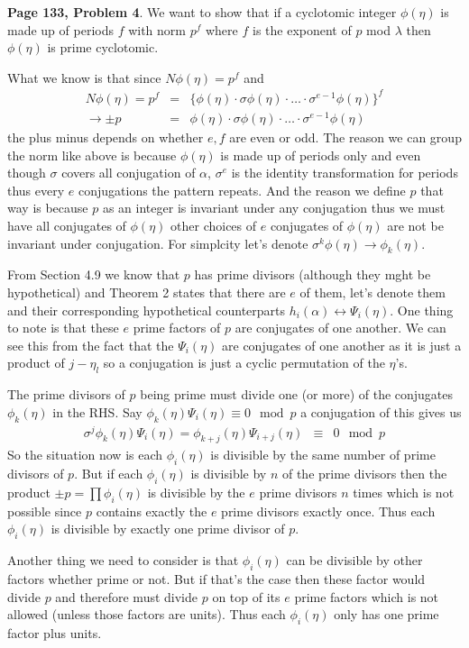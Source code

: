\documentclass[aps,preprint,preprintnumbers,nofootinbib,showpacs,prd]{revtex4-1}
\newcommand{\nbea}{\begin{eqnarray*}}
\newcommand{\neea}{\end{eqnarray*}}
\begin{document}
{\bf Page 133, Problem 4}. We want to show that if a cyclotomic integer $\phi(\eta)$ is made up of periods $f$ with norm $p^f$ where $f$ is the exponent of $p$ mod $\lambda$ then $\phi(\eta)$ is prime cyclotomic.

What we know is that since $N\phi(\eta) = p^f$ and
%
\nbea
N\phi(\eta) = p^f & = & \{\phi(\eta) \cdot \sigma\phi(\eta) \cdot \dots \cdot \sigma^{e-1}\phi(\eta) \}^f \\
\to \pm p & = & \phi(\eta) \cdot \sigma\phi(\eta) \cdot \dots \cdot \sigma^{e-1}\phi(\eta)
\neea
%
the plus minus depends on whether $e, f$ are even or odd. The reason we can group the norm like above is because $\phi(\eta)$ is made up of periods only and even though $\sigma$ covers all conjugation of $\alpha$, $\sigma^e$ is the identity transformation for periods thus every $e$ conjugations the pattern repeats. And the reason we define $p$ that way is because $p$ as an integer is invariant under any conjugation thus we must have all conjugates of $\phi(\eta)$ other choices of $e$ conjugates of $\phi(\eta)$ are not be invariant under conjugation. For simplcity let's denote $\sigma^k \phi(\eta) \to \phi_k(\eta)$.

From Section 4.9 we know that $p$ has prime divisors (although they mght be hypothetical) and Theorem 2 states that there are $e$ of them, let's denote them and their corresponding hypothetical counterparts $h_i(\alpha) \leftrightarrow \Psi_i(\eta)$. One thing to note is that these $e$ prime factors of $p$ are conjugates of one another. We can see this from the fact that the $\Psi_i(\eta)$ are conjugates of one another as it is just a product of $j - \eta_l$ so a conjugation is just a cyclic permutation of the $\eta$'s.

The prime divisors of $p$ being prime must divide one (or more) of the conjugates $\phi_k(\eta)$ in the RHS. Say $\phi_k(\eta) \Psi_i(\eta) \equiv 0 \mod{p}$ a conjugation of this gives us 
%
\nbea
\sigma^j \phi_k(\eta)\Psi_i(\eta)  = \phi_{k + j}(\eta) \Psi_{i + j}(\eta) & \equiv & 0 \mod{p}
\neea
%
So the situation now is each $\phi_i(\eta)$ is divisible by the same number of prime divisors of $p$. But if each $\phi_i(\eta)$ is divisible by $n$ of the prime divisors then the product $\pm p = \prod \phi_i(\eta)$ is divisible by the $e$ prime divisors $n$ times which is not possible since $p$ contains exactly the $e$ prime divisors exactly once. Thus each $\phi_i(\eta)$ is divisible by exactly one prime divisor of $p$.

Another thing we need to consider is that $\phi_i(\eta)$ can be divisible by other factors whether prime or not. But if that's the case then these factor would divide $p$ and therefore must divide $p$ on top of its $e$ prime factors which is not allowed (unless those factors are units). Thus each $\phi_i(\eta)$ only has one prime factor plus units.
\end{document}

